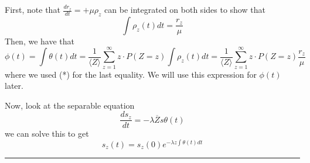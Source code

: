 \documentclass[twoside]{article}
\newenvironment{proof}{{\bf Proof:}}{\hfill\rule{2mm}{2mm}}
\begin{document}
\begin{proof} First, note that $\frac{dr_{z}}{dt} = +\mu\rho_z$ can be integrated on both sides to show that
\begin{equation}
\int \rho_z(t)dt = \frac{r_z}{\mu}
\tag{*}
\end{equation}
Then, we have that 
\begin{equation}
\phi(t) = \int \theta(t)dt = \frac{1}{\langle Z \rangle}\sum_{z=1}^{\infty}z \cdot P(Z = z) \int \rho_z(t)dt = \frac{1}{\langle Z \rangle}\sum_{z=1}^{\infty}z \cdot P(Z = z)\frac{r_z}{\mu}
\tag{**}
\end{equation}
where we used (*) for the last equality. We will use this expression for $\phi(t)$ later.

Now, look at the separable equation 
$$
\frac{ds_{z}}{dt} = -\lambda \overline{Z}s \theta(t)
$$
we can solve this to get 
\begin{equation}
s_z(t) = s_z(0)e^{-\lambda z \int \theta(t)dt}
\tag{***}
\end{equation}


\end{proof}
\end{document}
